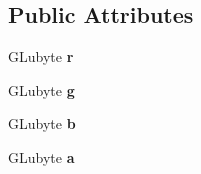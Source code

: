 \subsection*{Public Attributes}
\begin{DoxyCompactItemize}
\item 
\mbox{\label{structColor4B_aff7addfc835c535cca83f7fb1ea4ccce}} 
G\+Lubyte {\bfseries r}
\item 
\mbox{\label{structColor4B_a6e1e2684a5b818901033633f2c710ef0}} 
G\+Lubyte {\bfseries g}
\item 
\mbox{\label{structColor4B_a3263836e7248c5023173ea5c5e51acc9}} 
G\+Lubyte {\bfseries b}
\item 
\mbox{\label{structColor4B_aa7f0c91362f0aa54949ea3734d2ec070}} 
G\+Lubyte {\bfseries a}
\end{DoxyCompactItemize}
